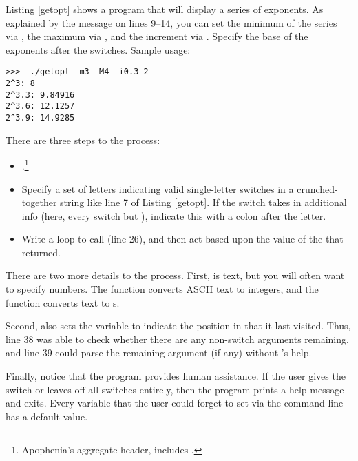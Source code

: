 Listing
\ref{getopt} shows a program that will display a series of exponents.
As explained by the message on lines 9--14, you can set the minimum of
the series via , the maximum via , and the increment via
. Specify the base of the exponents after the switches.
Sample usage:
\begin{lstlisting}
>>>  ./getopt -m3 -M4 -i0.3 2
2^3: 8
2^3.3: 9.84916
2^3.6: 12.1257
2^3.9: 14.9285
\end{lstlisting}

There are three steps to the process:
\begin{itemize}
\item {}.\footnote{Apophenia's aggregate header,
 includes .}
\item Specify a set of letters indicating valid single-letter switches in a crunched-together string like line 7 of Listing \ref{getopt}. If the switch
takes in additional info (here, every switch but ), indicate this with a colon after the letter. 
\item Write a  loop to call  (line 26), and then
act based upon the value of the  that  returned.
\end{itemize}

There are two more details to the process. First,  is text, but
you will often want to specify numbers. The function 
converts ASCII text to integers, and the function
 converts text to s. 

Second,  also sets the variable  to indicate the
position in  that it last visited. Thus, line 38 was able to
check whether there are any non-switch arguments remaining, and line 39
could parse the remaining argument (if any) without 's help.

Finally, notice that the program provides human assistance. If the user
gives the  switch or leaves off all switches entirely, then the
program prints a help message and exits. Every variable that the
user could forget to set via the command line has a default value.


